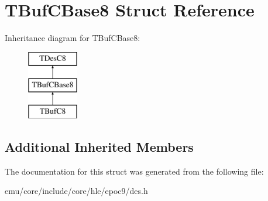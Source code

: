 \hypertarget{struct_t_buf_c_base8}{}\section{T\+Buf\+C\+Base8 Struct Reference}
\label{struct_t_buf_c_base8}
Inheritance diagram for T\+Buf\+C\+Base8\+:\begin{figure}[H]
\begin{center}
\leavevmode
\includegraphics[height=3.000000cm]{struct_t_buf_c_base8}
\end{center}
\end{figure}
\subsection*{Additional Inherited Members}


The documentation for this struct was generated from the following file\+:\begin{DoxyCompactItemize}
\item 
emu/core/include/core/hle/epoc9/des.\+h\end{DoxyCompactItemize}
